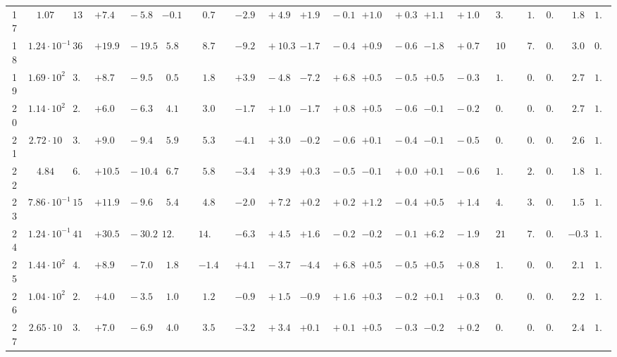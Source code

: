 \documentclass[12pt]{article}
\begin{document}
\begin{table}
\begin{tabular}{ccrr@{\hskip0pt}rrc@{\hskip0pt}r@{\hskip0pt}c@{\hskip0pt}r@{\hskip0pt}rr@{\hskip0pt}rr@{\hskip0pt}rr@{\hskip0pt}rr@{\hskip0pt}r@{\hskip0pt}r@{\hskip0pt}c|rr|r}
17 &$1.07$ &$13.5$  & ${+7.4~}$&${~-5.8}$ & $-0.1$  & &$ 0.7$&&${-2.9~}$&${~+4.9}$ & ${+1.9~}$&${~-0.1}$ & ${+1.0~}$&${~+0.3}$ & ${+1.1~}$&${~+1.0}$ & &$ 3.7$&&$ 1.9$  & $0.96$  & $ 1.8$  & $1.04$   \\ 
18 &$1.24 \cdot 10^{-1}$ &$36.5$  & ${+19.9~}$&${~-19.5}$ & $ 5.8$  & &$ 8.7$&&${-9.2~}$&${~+10.3}$ & ${-1.7~}$&${~-0.4}$ & ${+0.9~}$&${~-0.6}$ & ${-1.8~}$&${~+0.7}$ & &$10.4$&&$ 7.9$  & $0.96$  & $ 3.0$  & $0.98$   \\ 
19 &$1.69 \cdot 10^{2}$ &$ 3.8$  & ${+8.7~}$&${~-9.5}$ & $ 0.5$  & &$ 1.8$&&${+3.9~}$&${~-4.8}$ & ${-7.2~}$&${~+6.8}$ & ${+0.5~}$&${~-0.5}$ & ${+0.5~}$&${~-0.3}$ & &$ 1.8$&&$ 0.3$  & $0.89$  & $ 2.7$  & $1.03$   \\ 
20 &$1.14 \cdot 10^{2}$ &$ 2.4$  & ${+6.0~}$&${~-6.3}$ & $ 4.1$  & &$ 3.0$&&${-1.7~}$&${~+1.0}$ & ${-1.7~}$&${~+0.8}$ & ${+0.5~}$&${~-0.6}$ & ${-0.1~}$&${~-0.2}$ & &$ 0.8$&&$ 0.4$  & $0.92$  & $ 2.7$  & $1.02$   \\ 
21 &$2.72 \cdot 10$ &$ 3.1$  & ${+9.0~}$&${~-9.4}$ & $ 5.9$  & &$ 5.3$&&${-4.1~}$&${~+3.0}$ & ${-0.2~}$&${~-0.6}$ & ${+0.1~}$&${~-0.4}$ & ${-0.1~}$&${~-0.5}$ & &$ 0.8$&&$ 0.7$  & $0.94$  & $ 2.6$  & $1.03$   \\ 
22 &$4.84$ &$ 6.7$  & ${+10.5~}$&${~-10.4}$ & $ 6.7$  & &$ 5.8$&&${-3.4~}$&${~+3.9}$ & ${+0.3~}$&${~-0.5}$ & ${-0.1~}$&${~+0.0}$ & ${+0.1~}$&${~-0.6}$ & &$ 1.8$&&$ 2.5$  & $0.95$  & $ 1.8$  & $1.03$   \\ 
23 &$7.86 \cdot 10^{-1}$ &$15.2$  & ${+11.9~}$&${~-9.6}$ & $ 5.4$  & &$ 4.8$&&${-2.0~}$&${~+7.2}$ & ${+0.2~}$&${~+0.2}$ & ${+1.2~}$&${~-0.4}$ & ${+0.5~}$&${~+1.4}$ & &$ 4.3$&&$ 3.1$  & $0.96$  & $ 1.5$  & $1.05$   \\ 
24 &$1.24 \cdot 10^{-1}$ &$41.4$  & ${+30.5~}$&${~-30.2}$ & $12.5$  & &$14.2$&&${-6.3~}$&${~+4.5}$ & ${+1.6~}$&${~-0.2}$ & ${-0.2~}$&${~-0.1}$ & ${+6.2~}$&${~-1.9}$ & &$21.4$&&$ 7.1$  & $0.94$  & $-0.3$  & $1.07$   \\ 
25 &$1.44 \cdot 10^{2}$ &$ 4.2$  & ${+8.9~}$&${~-7.0}$ & $ 1.8$  & &$-1.4$&&${+4.1~}$&${~-3.7}$ & ${-4.4~}$&${~+6.8}$ & ${+0.5~}$&${~-0.5}$ & ${+0.5~}$&${~+0.8}$ & &$ 1.7$&&$ 0.3$  & $0.90$  & $ 2.1$  & $1.03$   \\ 
26 &$1.04 \cdot 10^{2}$ &$ 2.4$  & ${+4.0~}$&${~-3.5}$ & $ 1.0$  & &$ 1.2$&&${-0.9~}$&${~+1.5}$ & ${-0.9~}$&${~+1.6}$ & ${+0.3~}$&${~-0.2}$ & ${+0.1~}$&${~+0.3}$ & &$ 0.7$&&$ 0.3$  & $0.93$  & $ 2.2$  & $1.03$   \\ 
27 &$2.65 \cdot 10$ &$ 3.1$  & ${+7.0~}$&${~-6.9}$ & $ 4.0$  & &$ 3.5$&&${-3.2~}$&${~+3.4}$ & ${+0.1~}$&${~+0.1}$ & ${+0.5~}$&${~-0.3}$ & ${-0.2~}$&${~+0.2}$ & &$ 0.8$&&$ 0.6$  & $0.95$  & $ 2.4$  & $1.02$   \\ 

\end{tabular}
\end{table}
\end{document}
